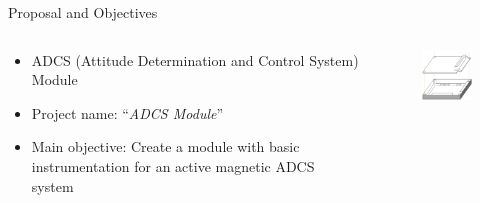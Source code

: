 %
%
%
%
%

%
%
%
%
%

\begin{frame}{Proposal and Objectives}
    
    \begin{columns}[t]
        \begin{column}[t]{0.65\textwidth}
            \begin{itemize}
                \item ADCS (Attitude Determination and Control System) Module
                \vspace{0.5cm}
                \item Project name: ``\textit{ADCS Module}''
                \vspace{0.5cm}
                \item Main objective: Create a module with basic instrumentation for an active magnetic ADCS system 
            \end{itemize}
        \end{column}
        \begin{column}[t]{0.4\textwidth}
            \begin{figure}[!ht]
                \begin{center}
                    \includegraphics[width=4cm]{figures/adcs-module-idea.png}
                \end{center}
            \end{figure}
        \end{column}
    \end{columns}
    
\end{frame}

